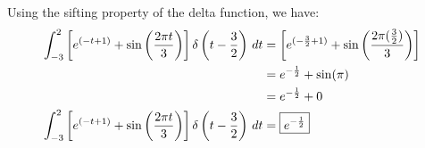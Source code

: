 \documentclass[a4paper, 10pt]{article}
\begin{document}
\begin{solution}
Using the sifting property of the delta function, we have:
\begin{align*}
    \int_{-3}^{2} \left[ e^{(-t+1)} + \sin \left( \frac{2\pi t}{3} \right) \right] \delta \left(t- \frac{3}{2} \right) \,dt &= \left[ e^{(-\frac{3}{2}+1)} + \sin \left( \frac{2\pi (\frac{3}{2})}{3} \right) \right] \\
    &= e^{-\frac{1}{2}} + \sin(\pi) \\
    &= e^{-\frac{1}{2}} + 0 \\
    \int_{-3}^{2} \left[ e^{(-t+1)} + \sin \left( \frac{2\pi t}{3} \right) \right] \delta \left(t- \frac{3}{2} \right) \,dt &= \boxed{e^{-\frac{1}{2}}}
\end{align*}
\end{solution}
\end{document}
